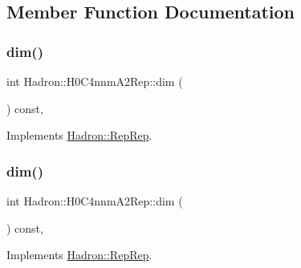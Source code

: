 \subsection{Member Function Documentation}
\mbox{\label{structHadron_1_1H0C4nnmA2Rep_a71bbdee3d58a78ed81bfa8191f3df986}} 
\subsubsection{\texorpdfstring{dim()}{dim()}\hspace{0.1cm}{\footnotesize\ttfamily [1/5]}}
{\footnotesize\ttfamily int Hadron\+::\+H0\+C4nnm\+A2\+Rep\+::dim (\begin{DoxyParamCaption}{ }\end{DoxyParamCaption}) const\hspace{0.3cm}{\ttfamily [inline]}, {\ttfamily [virtual]}}



Implements \mbox{\hyperlink{structHadron_1_1RepRep_a92c8802e5ed7afd7da43ccfd5b7cd92b}{Hadron\+::\+Rep\+Rep}}.

\mbox{\label{structHadron_1_1H0C4nnmA2Rep_a71bbdee3d58a78ed81bfa8191f3df986}} 
\subsubsection{\texorpdfstring{dim()}{dim()}\hspace{0.1cm}{\footnotesize\ttfamily [2/5]}}
{\footnotesize\ttfamily int Hadron\+::\+H0\+C4nnm\+A2\+Rep\+::dim (\begin{DoxyParamCaption}{ }\end{DoxyParamCaption}) const\hspace{0.3cm}{\ttfamily [inline]}, {\ttfamily [virtual]}}



Implements \mbox{\hyperlink{structHadron_1_1RepRep_a92c8802e5ed7afd7da43ccfd5b7cd92b}{Hadron\+::\+Rep\+Rep}}.

\mbox{\label{structHadron_1_1H0C4nnmA2Rep_a71bbdee3d58a78ed81bfa8191f3df986}} 
